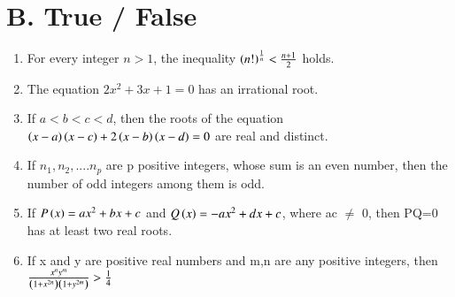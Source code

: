 \documentclass[journal,12pt,twocolumn]{IEEEtran}
\theoremstyle{remark}
\begin{document}
\section*{B. True / False}
\begin{enumerate}
    \item For every integer $n>1$, the inequality $\left(n!\right)^\frac{1}{n} < \frac{n+1}{2}$ holds. \hfill {}
    \item The equation $2x^2 + 3x + 1 = 0$ has an irrational root. \hfill {}
    \item If $a<b<c<d$, then the roots of the equation $\left(x-a\right)\left(x-c\right)+2\left(x-b\right)\left(x-d\right)=0$ are real and distinct. \hfill {}
    \item If $n_1, n_2, ....n_p$ are p positive integers, whose sum is an even number, then the number of odd integers among them is odd.\hfill {}
    \item If $P\left(x\right) = ax^2+bx+c$ and $Q\left(x\right)= -ax^2+dx+c$, where ac $\neq$ 0, then PQ=0 has at least two real roots. \hfill {}
    \item If x and y are positive real numbers and m,n are any positive integers, then $\frac{x^ny^m}{\left(1+ x^{2n}\right)\left(1+ y^{2m}\right)} > \frac{1}{4}$ \hfill {}



\end{enumerate}
\renewcommand{\thefigure}{\theenumi}
\renewcommand{\thetable}{\theenumi}
\end{document}
